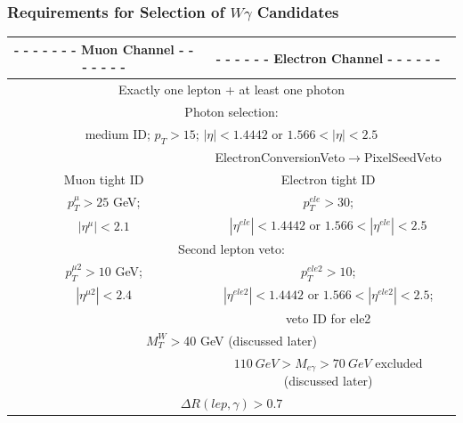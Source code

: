 \begin{frame}\frametitle{Requirements for Selection of $W\gamma$ Candidates}
\begin{table}[h]
\tiny
\begin{center}
\begin{tabular}{|c|c|}
{\footnotesize\bfseries{- - - - - - - Muon Channel - - - - - - -}} & 
{\footnotesize\bfseries{- - - - - - Electron Channel - - - - - -}}\\ \hline
 \multicolumn{2}{|c|}{Exactly one lepton + at least one photon}  \\ \hline
 \multicolumn{2}{|c|}{Photon selection:}\\
 \multicolumn{2}{|c|}{\tiny{medium ID; $p_T>15$; $|\eta| < 1.4442$ or $1.566 < |\eta| < 2.5$}}\\ 
               &{\tiny{ ElectronConversionVeto$\rightarrow$PixelSeedVeto}} \\ \hline
 Muon tight ID & Electron tight ID \\ \hline
 \tiny{$p_T^{\mu}>25$ GeV;} &  \tiny{$p_T^{ele}>30$;}  \\ 
 \tiny{$|\eta^{\mu}|<2.1$} & \tiny{$|\eta^{ele}| < 1.4442$ or $1.566 < |\eta^{ele}| < 2.5$} \\ \hline
 \multicolumn{2}{|c|}{Second lepton veto:}\\
 \tiny{$p_T^{\mu2}>10$ GeV;} &  \tiny{$p_T^{ele2}>10$;} \\
 \tiny{$|\eta^{\mu2}|<2.4$}  &   \tiny{$|\eta^{ele2}| < 1.4442$ or $1.566 < |\eta^{ele2}| < 2.5$;} \\
  &   \tiny{veto ID for ele2} \\ \hline
 \multicolumn{2}{|c|}{$M_T^W>$40 GeV (discussed later)} \\ \hline
  & $110~GeV>M_{e\gamma}>70~GeV$ excluded (discussed later) \\ \hline
 \multicolumn{2}{|c|}{$\Delta{R}(lep,\gamma)>0.7$}\\  \hline
\end{tabular}
\end{center}
\end{table}
\end{frame}%

